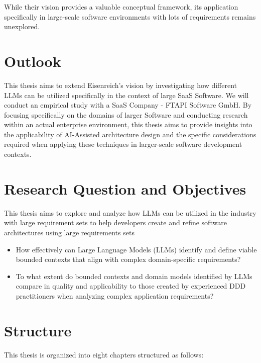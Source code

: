 While their vision provides a valuable conceptual framework, its application specifically in large-scale software environments with lots of requirements remains unexplored. 

\section{Outlook}
This thesis aims to extend Eisenreich's vision by investigating how different LLMs can be utilized specifically in the context of large SaaS Software. We will conduct an empirical study with a SaaS Company - FTAPI Software GmbH. By focusing specifically on the domains of larger Software and conducting research within an actual enterprise environment, this thesis aims to provide insights into the applicability of AI-Assisted architecture design and the specific considerations required when applying these techniques in larger-scale software development contexts.

\section{Research Question and Objectives}

This thesis aims to explore and analyze how LLMs can be utilized in the industry with large requirement sets to help developers create and refine software architectures using large requirements sets

\begin{itemize}
    \item How effectively can Large Language Models (LLMs) identify and define viable bounded contexts that align with complex domain-specific requirements?
    \item To what extent do bounded contexts and domain models identified by LLMs compare in quality and applicability to those created by experienced DDD practitioners when analyzing complex application requirements?
\end{itemize}

\section{Structure}

This thesis is organized into eight chapters structured as follows:

